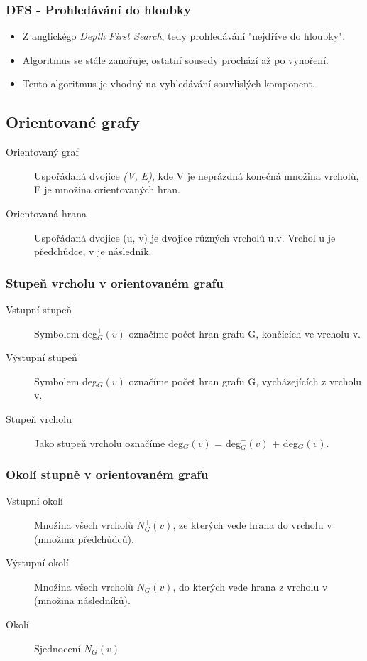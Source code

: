     \subsubsection{DFS - Prohledávání do hloubky}
      \begin{itemize}
        \item Z anglickégo \emph{Depth First Search}, tedy prohledávání "nejdříve do hloubky".
        \item Algoritmus se stále zanořuje, ostatní sousedy prochází až po vynoření.
        \item Tento algoritmus je vhodný na vyhledávání souvlislých komponent.
      \end{itemize}

  \subsection{Orientované grafy}

    \begin{description}
      \item[Orientovaný graf] Uspořádaná dvojice \emph{(V, E)}, kde V je neprázdná konečná množina vrcholů, E je množina orientovaných hran.
      \item[Orientovaná hrana] Uspořádaná dvojice (u, v) je dvojice různých vrcholů u,v. Vrchol u je předchůdce, v je následník.
    \end{description}

    \subsubsection{Stupeň vrcholu v orientovaném grafu}
      \begin{description}
        \item[Vstupní stupeň] Symbolem deg${}_G^+(v)$ označíme počet hran grafu G, končících ve vrcholu v.
        \item[Výstupní stupeň] Symbolem deg${}_G^-(v)$ označíme počet hran grafu G, vycházejících z vrcholu v.
        \item[Stupeň vrcholu] Jako stupeň vrcholu označíme deg${}_G(v)$ = deg${}_G^+(v)$ + deg${}_G^-(v)$.
      \end{description}

    \subsubsection{Okolí stupně v orientovaném grafu}
      \begin{description}
        \item[Vstupní okolí] Množina všech vrcholů $N_G^+(v)$, ze kterých vede hrana do vrcholu v (množina předchůdců).
        \item[Výstupní okolí] Množina všech vrcholů $N_G^-(v)$, do kterých vede hrana z vrcholu v (množina následníků).
        \item[Okolí] Sjednocení $N_G (v)$
      \end{description}

